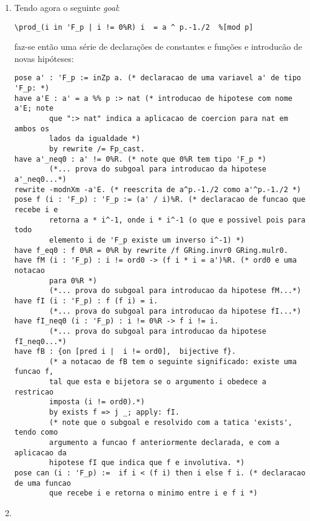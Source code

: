 \begin{enumerate}
        \item Tendo agora o seguinte \textit{goal}:
        \begin{tcolorbox}[colback=green!50!white,colframe=green!100!black,width=14.7cm]
        \begin{lstlisting}[language=coq]
\prod_(i in 'F_p | i != 0%R) i  = a ^ p.-1./2  %[mod p]
        \end{lstlisting}
        \end{tcolorbox}
        faz-se então uma série de declarações de constantes e funções e introducão de novas hipóteses:
        \begin{lstlisting}[language=coq]
pose a' : 'F_p := inZp a. (* declaracao de uma variavel a' de tipo 'F_p: *)
have a'E : a' = a %% p :> nat (* introducao de hipotese com nome a'E; note 
        que ":> nat" indica a aplicacao de coercion para nat em ambos os 
        lados da igualdade *)
        by rewrite /= Fp_cast.
have a'_neq0 : a' != 0%R. (* note que 0%R tem tipo 'F_p *)
        (*... prova do subgoal para introducao da hipotese a'_neq0...*)
rewrite -modnXm -a'E. (* reescrita de a^p.-1./2 como a'^p.-1./2 *)
pose f (i : 'F_p) : 'F_p := (a' / i)%R. (* declaracao de funcao que recebe i e 
        retorna a * i^-1, onde i * i^-1 (o que e possivel pois para todo 
        elemento i de 'F_p existe um inverso i^-1) *)
have f_eq0 : f 0%R = 0%R by rewrite /f GRing.invr0 GRing.mulr0. 
have fM (i : 'F_p) : i != ord0 -> (f i * i = a')%R. (* ord0 e uma notacao 
        para 0%R *)
        (*... prova do subgoal para introducao da hipotese fM...*)
have fI (i : 'F_p) : f (f i) = i.
        (*... prova do subgoal para introducao da hipotese fI...*)
have fI_neq0 (i : 'F_p) : i != 0%R -> f i != i.
        (*... prova do subgoal para introducao da hipotese fI_neq0...*)
have fB : {on [pred i |  i != ord0],  bijective f}.
        (* a notacao de fB tem o seguinte significado: existe uma funcao f, 
        tal que esta e bijetora se o argumento i obedece a restricao 
        imposta (i != ord0).*)
        by exists f => j _; apply: fI.
        (* note que o subgoal e resolvido com a tatica 'exists', tendo como 
        argumento a funcao f anteriormente declarada, e com a aplicacao da 
        hipotese fI que indica que f e involutiva. *)
pose can (i : 'F_p) :=  if i < (f i) then i else f i. (* declaracao de uma funcao 
        que recebe i e retorna o minimo entre i e f i *)

        \end{lstlisting}

        \item 
\end{enumerate}

